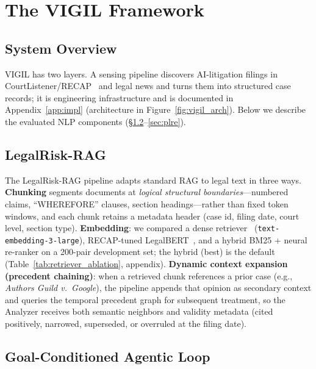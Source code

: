 \section{The VIGIL Framework}
\label{sec:framework}
\subsection{System Overview}

VIGIL has two layers. A sensing pipeline discovers AI-litigation filings in CourtListener/RECAP~\citep{courtlistener2023} and legal news and turns them into structured case records; it is engineering infrastructure and is documented in Appendix~\ref{app:impl} (architecture in Figure~\ref{fig:vigil_arch}). Below we describe the evaluated NLP components (\S\ref{sec:legalrag}--\ref{sec:plre}).

\subsection{LegalRisk-RAG}
\label{sec:legalrag}

The LegalRisk-RAG pipeline adapts standard RAG to legal text in three ways. \textbf{Chunking} segments documents at \emph{logical structural boundaries}---numbered claims, ``WHEREFORE'' clauses, section headings---rather than fixed token windows, and each chunk retains a metadata header (case id, filing date, court level, section type). \textbf{Embedding}: we compared a dense retriever~\citep{karpukhin2020dense} (\texttt{text-embedding-3-large}), RECAP-tuned LegalBERT~\citep{chalkidis2020legalbert}, and a hybrid BM25 + neural re-ranker on a 200-pair development set; the hybrid (best) is the default (Table~\ref{tab:retriever_ablation}, appendix). \textbf{Dynamic context expansion (precedent chaining)}: when a retrieved chunk references a prior case (e.g., \emph{Authors Guild v.\ Google}), the pipeline appends that opinion as secondary context and queries the temporal precedent graph for subsequent treatment, so the Analyzer receives both semantic neighbors and validity metadata (cited positively, narrowed, superseded, or overruled at the filing date).

\subsection{Goal-Conditioned Agentic Loop}
\label{sec:agentic_loop}


